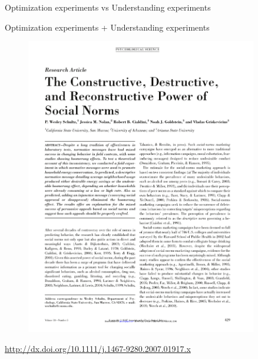 \documentclass[aspectratio=169]{beamer}
\begin{document}
\begin{frame}

\Large{
\begin{center}
Optimization experiments vs  Understanding experiments
\end{center}
}

\end{frame}
\begin{frame}

\Large{
\begin{center}
Optimization experiments + Understanding experiments
\end{center}
}

\end{frame}
\begin{frame}

\begin{figure}
  \centering
  \includegraphics[width = 0.9\textwidth]{figures/schultz_constructive_2007_title}
\end{figure}

\vfill
\tiny{\url{http://dx.doi.org/10.1111/j.1467-9280.2007.01917.x}}

\end{frame}
\end{document}
